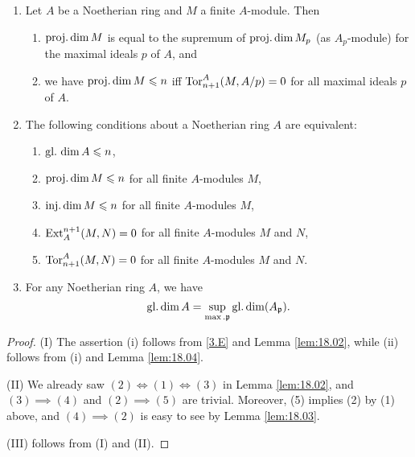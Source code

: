 \documentclass[../main]{subfiles}
\begin{document}
\begin{lemma}\leavevmode\label{lem:18.05}
\begin{enumerate}[label=(\Roman*)]
    \item \label{lem:18.05.1} Let $A$ be a Noetherian ring and $M$ a finite $A$-module. Then \begin{enumerate}[label=(\roman*)]
        \item $\ProjDim M$ is equal to the supremum of $\ProjDim M_p$ (as $A_p$-module) for the maximal ideals $p$ of $A$, and\label{lem:18.05.1.1}
        \item we have $\ProjDim M \leqslant n$ iff $\Tor_{n+1}^A(M,A/p)=0$ for all maximal ideals $p$ of $A$.\label{lem:18.05.1.2}
    \end{enumerate}
    \item \label{lem:18.05.2} The following conditions about a Noetherian ring $A$ are equivalent:
    \begin{enumerate}[label = (\arabic*)]
        \item $\text{gl}. \hspace{0.55 mm} \dim A \leqslant n$,\label{lem:18.05.2.1}
        \item $\ProjDim M \leqslant n$ for all finite $A$-modules $M$,\label{lem:18.05.2.2}
        \item $\InjDim M \leqslant n$ for all finite $A$-modules $M$,\label{lem:18.05.2.3} 
        \item $\Ext_A^{n+1}(M,N)=0$ for all finite $A$-modules $M$ and $N$, \label{lem:18.05.2.4}
        \item $\Tor_{n+1}^A(M,N)=0$ for all finite $A$-modules $M$ and $N$. \label{lem:18.05.2.5}
    \end{enumerate}
    \item\label{lem:18.05.3} For any Noetherian ring $A$, we have 
    \[\GlDim A=\sup_{\max.\ideal{p}}\GlDim(A_\ideal{p}).\]
\end{enumerate}
\end{lemma}
\begin{proof}
(I) The assertion (i) follows from \ref{3.E} and Lemma \ref{lem:18.02}, while (ii) follows from (i) and Lemma \ref{lem:18.04}.


(II) We already saw $(2)\iff (1) \iff (3)$ in Lemma \ref{lem:18.02}, and $(3)\implies (4)$ and $(2) \implies (5)$ are trivial. Moreover, (5) implies (2) by (1) above, and \newline $(4) \implies (2)$ is easy to see by Lemma \ref{lem:18.03}.

(III) follows from (I) and (II).
\end{proof}
\end{document}
